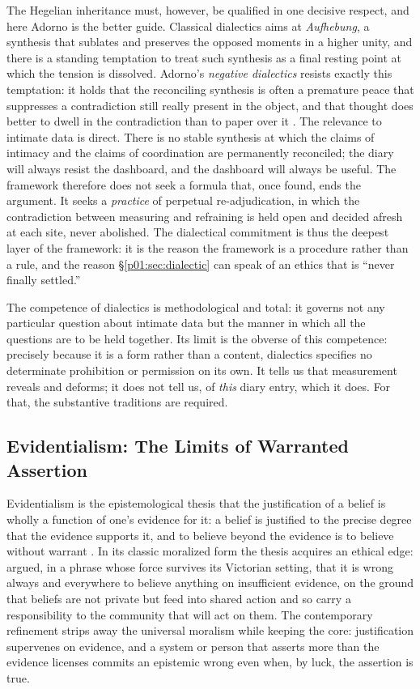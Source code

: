 \documentclass[11pt,a4paper]{article}
\begin{document}
The Hegelian inheritance must, however, be qualified in one decisive respect, and here Adorno is the better guide. Classical dialectics aims at \emph{Aufhebung}, a synthesis that sublates and preserves the opposed moments in a higher unity, and there is a standing temptation to treat such synthesis as a final resting point at which the tension is dissolved. Adorno's \emph{negative dialectics} resists exactly this temptation: it holds that the reconciling synthesis is often a premature peace that suppresses a contradiction still really present in the object, and that thought does better to dwell in the contradiction than to paper over it \parencite{adorno1966negative}. The relevance to intimate data is direct. There is no stable synthesis at which the claims of intimacy and the claims of coordination are permanently reconciled; the diary will always resist the dashboard, and the dashboard will always be useful. The framework therefore does not seek a formula that, once found, ends the argument. It seeks a \emph{practice} of perpetual re-adjudication, in which the contradiction between measuring and refraining is held open and decided afresh at each site, never abolished. The dialectical commitment is thus the deepest layer of the framework: it is the reason the framework is a procedure rather than a rule, and the reason §\ref{p01:sec:dialectic} can speak of an ethics that is ``never finally settled.''

The competence of dialectics is methodological and total: it governs not any particular question about intimate data but the manner in which all the questions are to be held together. Its limit is the obverse of this competence: precisely because it is a form rather than a content, dialectics specifies no determinate prohibition or permission on its own. It tells us that measurement reveals and deforms; it does not tell us, of \emph{this} diary entry, which it does. For that, the substantive traditions are required.

\subsection{Evidentialism: The Limits of Warranted Assertion}\label{p01:sec:evidentialism}

Evidentialism is the epistemological thesis that the justification of a belief is wholly a function of one's evidence for it: a belief is justified to the precise degree that the evidence supports it, and to believe beyond the evidence is to believe without warrant \parencite{feldman1985evidentialism}. In its classic moralized form the thesis acquires an ethical edge: \textcite{clifford1877ethics} argued, in a phrase whose force survives its Victorian setting, that it is wrong always and everywhere to believe anything on insufficient evidence, on the ground that beliefs are not private but feed into shared action and so carry a responsibility to the community that will act on them. The contemporary refinement strips away the universal moralism while keeping the core: justification supervenes on evidence, and a system or person that asserts more than the evidence licenses commits an epistemic wrong even when, by luck, the assertion is true.
\end{document}
